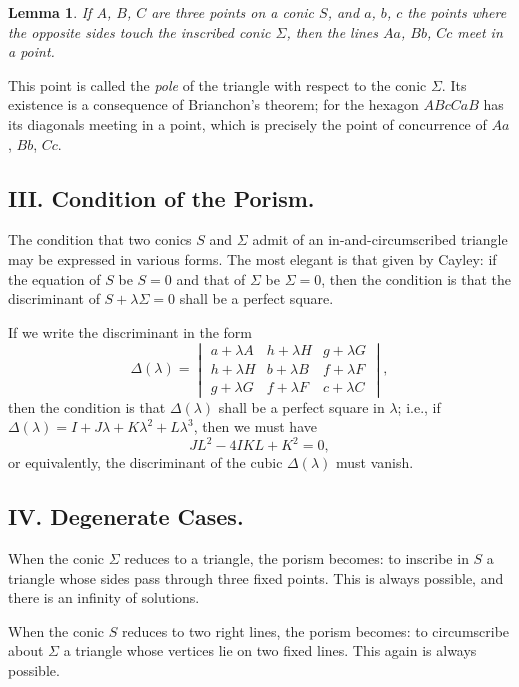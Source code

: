 \documentclass[11pt,a4paper]{book}
\newtheorem*{lemma}{Lemma}
\begin{document}
\begin{lemma}
If $A$, $B$, $C$ are three points on a conic $S$, and $a$, $b$, $c$ the points where the opposite sides touch the inscribed conic $\Sigma$, then the lines $Aa$, $Bb$, $Cc$ meet in a point.
\end{lemma}

This point is called the \textit{pole} of the triangle with respect to the conic $\Sigma$. Its existence is a consequence of Brianchon's theorem; for the hexagon $ABcCaB$ has its diagonals meeting in a point, which is precisely the point of concurrence of $Aa$, $Bb$, $Cc$.

\subsection*{III. Condition of the Porism.}

The condition that two conics $S$ and $\Sigma$ admit of an in-and-circumscribed triangle may be expressed in various forms. The most elegant is that given by Cayley: if the equation of $S$ be $S=0$ and that of $\Sigma$ be $\Sigma=0$, then the condition is that the discriminant of $S+\lambda\Sigma=0$ shall be a perfect square.

If we write the discriminant in the form
\[
\Delta(\lambda) = \begin{vmatrix}
a+\lambda A & h+\lambda H & g+\lambda G \\
h+\lambda H & b+\lambda B & f+\lambda F \\
g+\lambda G & f+\lambda F & c+\lambda C
\end{vmatrix},
\]
then the condition is that $\Delta(\lambda)$ shall be a perfect square in $\lambda$; i.e., if $\Delta(\lambda)=I+J\lambda+K\lambda^2+L\lambda^3$, then we must have
\[
JL^2 - 4IKL + K^2 = 0,
\]
or equivalently, the discriminant of the cubic $\Delta(\lambda)$ must vanish.

\subsection*{IV. Degenerate Cases.}

When the conic $\Sigma$ reduces to a triangle, the porism becomes: to inscribe in $S$ a triangle whose sides pass through three fixed points. This is always possible, and there is an infinity of solutions.

When the conic $S$ reduces to two right lines, the porism becomes: to circumscribe about $\Sigma$ a triangle whose vertices lie on two fixed lines. This again is always possible.
\end{document}

